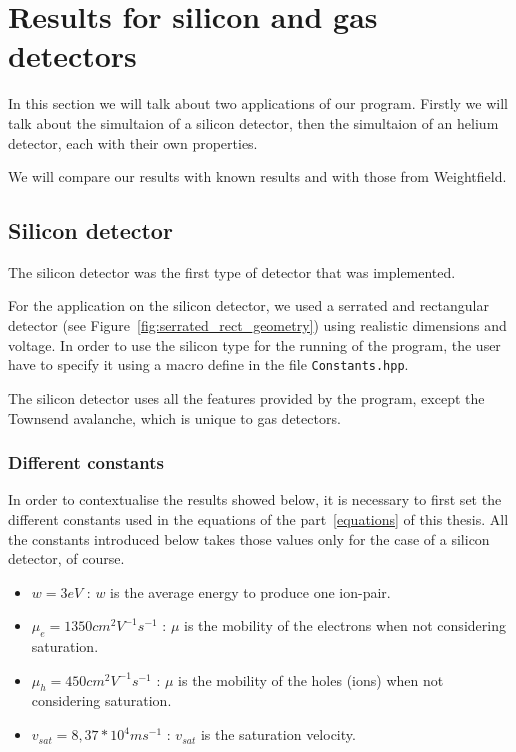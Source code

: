 \documentclass[11pt]{article}
\begin{document}
\section{Results for silicon and gas detectors}

	In this section we will talk about two applications of our program.
	Firstly we will talk about the simultaion of a silicon detector, then the 
	simultaion of an helium detector, each with their own properties.

	We will compare our results with known results and with those from Weightfield.

	\subsection{Silicon detector}

		The silicon detector was the first type of detector that was implemented.

		For the application on the silicon detector, we used a serrated and rectangular detector 
		(see Figure~\ref{fig:serrated_rect_geometry}) using realistic dimensions and voltage.
		In order to use the silicon type for the running of the program, the user have to specify
		it using a macro define in the file \texttt{Constants.hpp}.

		The silicon detector uses all the features provided by the program, except the Townsend 
		avalanche, which is unique to gas detectors.

		\subsubsection*{Different constants}

			In order to contextualise the results showed below, it is necessary to first set the 
			different constants used in the equations of the part~\ref{equations} of this thesis.
			All the constants introduced below takes those values only for the case of a silicon 
			detector, of course.

			\begin{itemize}

				\item $w = 3 eV$ : $w$ is the average energy to produce one ion-pair.
				\item $\mu_e = 1350 cm^2V^{-1}s^{-1}$ : $\mu$ is the mobility of the electrons 
					when not considering saturation.
				\item $\mu_h = 450 cm^2V^{-1}s^{-1}$ : $\mu$ is the mobility of the holes (ions) 
					when not considering saturation.
				\item $v_{sat} = 8,37*10^{4} ms^{-1}$ : $v_{sat}$ is the saturation velocity.

			\end{itemize}
\end{document}
